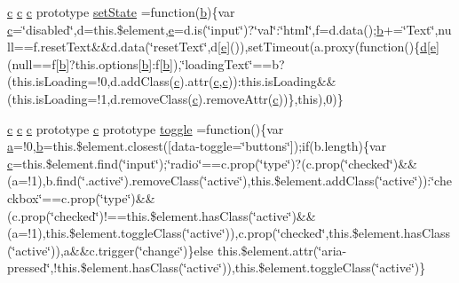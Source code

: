 \begin{DoxyCompactItemize}
\item 
\hyperlink{a00029_ad9d1ac02e33c4aed62ad517a7cb8b3fb}{c} \hyperlink{a00029_ad9d1ac02e33c4aed62ad517a7cb8b3fb}{c} \hyperlink{a00029_ad9d1ac02e33c4aed62ad517a7cb8b3fb}{c} prototype \hyperlink{a00029_a14f119ea3b5abc5536d590dfe1793c6e}{set\+State} =function(\hyperlink{a00029_a398bb8542498d1b14178b02b99df309b}{b})\{var \hyperlink{a00029_ad9d1ac02e33c4aed62ad517a7cb8b3fb}{c}=\char`\"{}disabled\char`\"{},d=this.\$element,\hyperlink{a00029_ab5902775854a8b8440bcd25e0fe1c120}{e}=d.\+is(\char`\"{}input\char`\"{})?\char`\"{}val\char`\"{}\+:\char`\"{}html\char`\"{},f=d.\+data();\hyperlink{a00029_a398bb8542498d1b14178b02b99df309b}{b}+=\char`\"{}Text\char`\"{},null==f.\+reset\+Text\&\&d.\+data(\char`\"{}reset\+Text\char`\"{},d\mbox{[}\hyperlink{a00029_ab5902775854a8b8440bcd25e0fe1c120}{e}\mbox{]}()),set\+Timeout(a.\+proxy(function()\{\hyperlink{a00029_aeb337d295abaddb5ec3cb34cc2e2bbc9}{d}\mbox{[}\hyperlink{a00029_ab5902775854a8b8440bcd25e0fe1c120}{e}\mbox{]}(null==f\mbox{[}\hyperlink{a00029_a398bb8542498d1b14178b02b99df309b}{b}\mbox{]}?this.\+options\mbox{[}\hyperlink{a00029_a398bb8542498d1b14178b02b99df309b}{b}\mbox{]}\+:f\mbox{[}\hyperlink{a00029_a398bb8542498d1b14178b02b99df309b}{b}\mbox{]}),\char`\"{}loading\+Text\char`\"{}==b?(this.\+is\+Loading=!0,d.\+add\+Class(\hyperlink{a00029_ad9d1ac02e33c4aed62ad517a7cb8b3fb}{c}).attr(\hyperlink{a00029_ad9d1ac02e33c4aed62ad517a7cb8b3fb}{c},\hyperlink{a00029_ad9d1ac02e33c4aed62ad517a7cb8b3fb}{c}))\+:this.\+is\+Loading\&\&(this.\+is\+Loading=!1,d.\+remove\+Class(\hyperlink{a00029_ad9d1ac02e33c4aed62ad517a7cb8b3fb}{c}).remove\+Attr(\hyperlink{a00029_ad9d1ac02e33c4aed62ad517a7cb8b3fb}{c}))\},this),0)\}
\item 
\hyperlink{a00029_ad9d1ac02e33c4aed62ad517a7cb8b3fb}{c} \hyperlink{a00029_ad9d1ac02e33c4aed62ad517a7cb8b3fb}{c} \hyperlink{a00029_ad9d1ac02e33c4aed62ad517a7cb8b3fb}{c} prototype \hyperlink{a00029_ad9d1ac02e33c4aed62ad517a7cb8b3fb}{c} prototype \hyperlink{a00029_aa8e797a9bda5e7e313be3518054164a3}{toggle} =function()\{var \hyperlink{a00029_a1f5870dcf487187f13d5fd328ed9e6e7}{a}=!0,\hyperlink{a00029_a398bb8542498d1b14178b02b99df309b}{b}=this.\$element.\+closest(\textquotesingle{}\mbox{[}data-\/toggle=\char`\"{}buttons\char`\"{}\mbox{]}\textquotesingle{});if(b.\+length)\{var \hyperlink{a00029_ad9d1ac02e33c4aed62ad517a7cb8b3fb}{c}=this.\$element.\+find(\char`\"{}input\char`\"{});\char`\"{}radio\char`\"{}==c.\+prop(\char`\"{}type\char`\"{})?(c.\+prop(\char`\"{}checked\char`\"{})\&\&(a=!1),b.\+find(\char`\"{}.active\char`\"{}).remove\+Class(\char`\"{}active\char`\"{}),this.\$element.\+add\+Class(\char`\"{}active\char`\"{}))\+:\char`\"{}checkbox\char`\"{}==c.\+prop(\char`\"{}type\char`\"{})\&\&(c.\+prop(\char`\"{}checked\char`\"{})!==this.\$element.\+has\+Class(\char`\"{}active\char`\"{})\&\&(a=!1),this.\$element.\+toggle\+Class(\char`\"{}active\char`\"{})),c.\+prop(\char`\"{}checked\char`\"{},this.\$element.\+has\+Class(\char`\"{}active\char`\"{})),a\&\&c.\+trigger(\char`\"{}change\char`\"{})\}else this.\$element.\+attr(\char`\"{}aria-\/pressed\char`\"{},!this.\$element.\+has\+Class(\char`\"{}active\char`\"{})),this.\$element.\+toggle\+Class(\char`\"{}active\char`\"{})\}

\end{DoxyCompactItemize}
